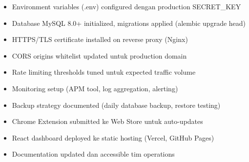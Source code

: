 \documentclass[12pt,a4paper]{article}
\begin{document}
\begin{itemize}
  \item[$\square$] Environment variables (.env) configured dengan production SECRET\_KEY
  \item[$\square$] Database MySQL 8.0+ initialized, migrations applied (alembic upgrade head)
  \item[$\square$] HTTPS/TLS certificate installed on reverse proxy (Nginx)
  \item[$\square$] CORS origins whitelist updated untuk production domain
  \item[$\square$] Rate limiting thresholds tuned untuk expected traffic volume
  \item[$\square$] Monitoring setup (APM tool, log aggregation, alerting)
  \item[$\square$] Backup strategy documented (daily database backup, restore testing)
  \item[$\square$] Chrome Extension submitted ke Web Store untuk auto-updates
  \item[$\square$] React dashboard deployed ke static hosting (Vercel, GitHub Pages)
  \item[$\square$] Documentation updated dan accessible tim operations
\end{itemize}
\end{document}
